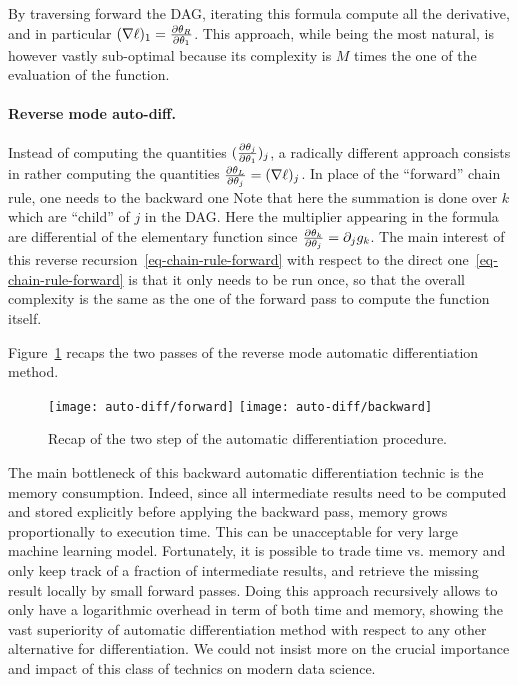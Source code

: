 By traversing forward the DAG, iterating this formula compute all the derivative, and in particular $(\nabla \ell)_1 = \frac{ \partial \theta_R}{\partial \theta_1}$. 
%
This approach, while being the most natural, is however vastly sub-optimal because its complexity is $M$ times the one of the evaluation of the function. 

\paragraph{Reverse mode auto-diff.}

Instead of computing the quantities $(\frac{ \partial \theta_j}{\partial \theta_1})_j$, a radically different approach consists in rather computing the quantities $\frac{ \partial \theta_L}{\partial \theta_j} = (\nabla \ell)_j$. In place of the ``forward'' chain rule, one needs to the backward one
Note that here the summation is done over $k$ which are ``child'' of $j$ in the DAG. Here the multiplier appearing in the formula are differential of the elementary function since $\frac{ \partial \theta_k}{\partial \theta_j} = \partial_j g_k$. 
%
The main interest of this reverse recursion~\eqref{eq-chain-rule-forward} with respect to the direct one~\eqref{eq-chain-rule-forward} is that it only needs to be run once, so that the overall complexity is the same as the one of the forward pass to compute the function itself. 

Figure~\ref{fig-fwdbwd} recaps the two passes of the reverse mode automatic differentiation method.

\begin{figure}
\centering
\texttt{[image: auto-diff/forward]}
\qquad
\texttt{[image: auto-diff/backward]}
\caption{\label{fig-fwdbwd}
Recap of the two step of the automatic differentiation procedure.
}
\end{figure}

The main bottleneck of this backward automatic differentiation technic is the memory consumption. Indeed, since all intermediate results need to be computed and stored explicitly before applying the backward pass, memory grows proportionally to execution time. This can be unacceptable for very large machine learning model. Fortunately, it is possible to trade time vs. memory and only keep track of a fraction of intermediate results, and retrieve the missing result locally by small forward passes. Doing this approach recursively allows to only have a logarithmic overhead in term of both time and memory, showing the vast superiority of automatic differentiation method with respect to any other alternative for differentiation. We could not insist more on the crucial importance and impact of this class of technics on modern data science. 